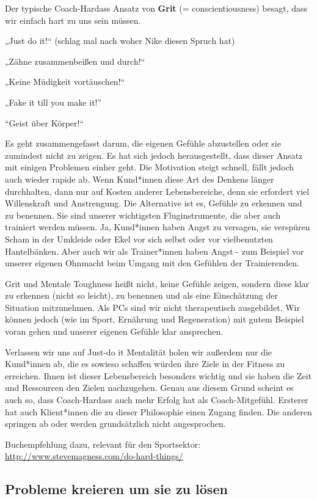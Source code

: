 \documentclass[
  letterpaper,
  DIV=11,
  numbers=noendperiod]{scrreprt}
\begin{document}
Der typische Coach-Hardass Ansatz von \textbf{Grit} (=
conscientiousness) besagt, dass wir einfach hart zu uns sein müssen.

„Just do it!{}`` (schlag mal nach woher Nike diesen Spruch hat)

„Zähne zusammenbeißen und durch!{}``

„Keine Müdigkeit vortäuschen!{}``

„Fake it till you make it!''

``Geist über Körper!{}``

Es geht zusammengefasst darum, die eigenen Gefühle abzustellen oder sie
zumindest nicht zu zeigen. Es hat sich jedoch herausgestellt, dass
dieser Ansatz mit einigen Problemen einher geht. Die Motivation steigt
schnell, fällt jedoch auch wieder rapide ab. Wenn Kund*innen diese Art
des Denkens länger durchhalten, dann nur auf Kosten anderer
Lebensbereiche, denn sie erfordert viel Willenskraft und Anstrengung.
Die Alternative ist es, Gefühle zu erkennen und zu benennen. Sie sind
unserer wichtigsten Fluginstrumente, die aber auch trainiert werden
müssen. Ja, Kund*innen haben Angst zu versagen, sie verspüren Scham in
der Umkleide oder Ekel vor sich selbst oder vor vielbenutzten
Hantelbänken. Aber auch wir als Trainer*innen haben Angst - zum Beispiel
vor unserer eigenen Ohnmacht beim Umgang mit den Gefühlen der
Trainierenden.

Grit und Mentale Toughness heißt nicht, keine Gefühle zeigen, sondern
diese klar zu erkennen (nicht so leicht), zu benennen und als eine
Einschätzung der Situation mitzunehmen. Als PCs sind wir nicht
therapeutisch ausgebildet. Wir können jedoch (wie im Sport, Ernährung
und Regeneration) mit gutem Beispiel voran gehen und unserer eigenen
Gefühle klar ansprechen.

Verlassen wir uns auf Just-do it Mentalität holen wir außerdem nur die
Kund*innen ab, die es sowieso schaffen würden ihre Ziele in der Fitness
zu erreichen. Ihnen ist dieser Lebensbereich besonders wichtig und sie
haben die Zeit und Ressourcen den Zielen nachzugehen. Genau aus diesem
Grund scheint es auch so, dass Coach-Hardass auch mehr Erfolg hat als
Coach-Mitgefühl. Ersterer hat auch Klient*innen die zu dieser
Philosophie einen Zugang finden. Die anderen springen ab oder werden
grundsätzlich nicht angesprochen.

Buchempfehlung dazu, relevant für den Sportsektor:
\url{http://www.stevemagness.com/do-hard-things/}

\subsection{Probleme kreieren um sie zu
lösen}\label{probleme-kreieren-um-sie-zu-luxf6sen}
\end{document}
